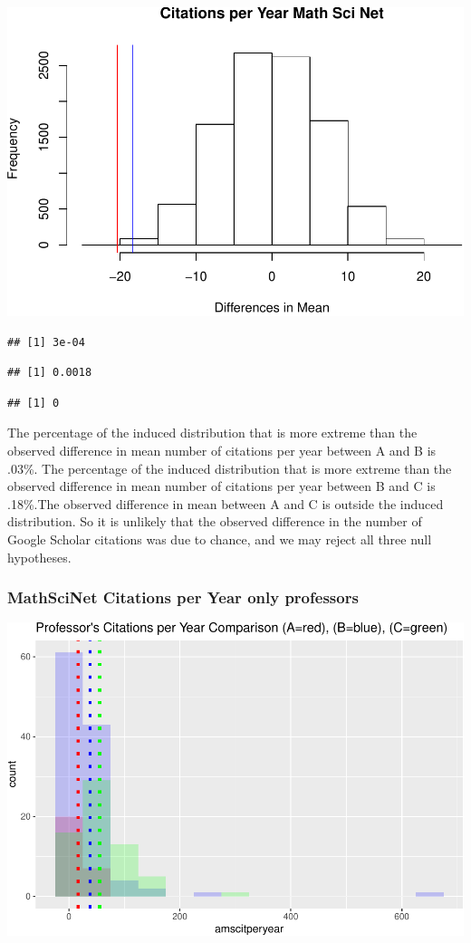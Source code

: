 \documentclass[]{article}
\begin{document}
\includegraphics{final_files/figure-latex/unnamed-chunk-35-1.pdf}

\begin{verbatim}
## [1] 3e-04
\end{verbatim}

\begin{verbatim}
## [1] 0.0018
\end{verbatim}

\begin{verbatim}
## [1] 0
\end{verbatim}

The percentage of the induced distribution that is more extreme than the
observed difference in mean number of citations per year between A and B
is .03\%. The percentage of the induced distribution that is more
extreme than the observed difference in mean number of citations per
year between B and C is .18\%.The observed difference in mean between A
and C is outside the induced distribution. So it is unlikely that the
observed difference in the number of Google Scholar citations was due to
chance, and we may reject all three null hypotheses.

\hypertarget{mathscinet-citations-per-year-only-professors}{%
\subsubsection{MathSciNet Citations per Year only
professors}\label{mathscinet-citations-per-year-only-professors}}

\includegraphics{final_files/figure-latex/unnamed-chunk-37-1.pdf}
\end{document}
